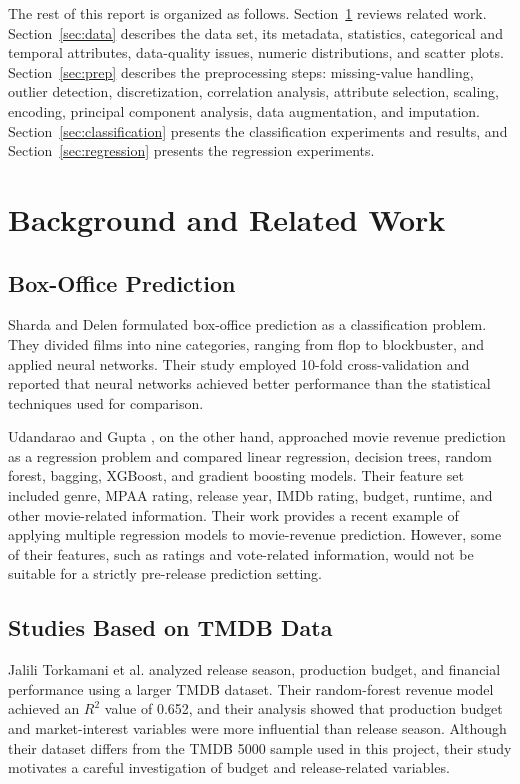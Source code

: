 \documentclass[conference]{IEEEtran}
\begin{document}
The rest of this report is organized as follows. Section~\ref{sec:related} reviews related work. Section~\ref{sec:data} describes the data set, its metadata, statistics, categorical and temporal attributes, data-quality issues, numeric distributions, and scatter plots. Section~\ref{sec:prep} describes the preprocessing steps: missing-value handling, outlier detection, discretization, correlation analysis, attribute selection, scaling, encoding, principal component analysis, data augmentation, and imputation. Section~\ref{sec:classification} presents the classification experiments and results, and Section~\ref{sec:regression} presents the regression experiments.

\section{Background and Related Work}\label{sec:related}

\subsection{Box-Office Prediction}

Sharda and Delen \cite{sharda2006} formulated box-office prediction as a classification problem. They divided films into nine categories, ranging from flop to blockbuster, and applied neural networks. Their study employed 10-fold cross-validation and reported that neural networks achieved better performance than the statistical techniques used for comparison.

Udandarao and Gupta \cite{udandarao2024}, on the other hand, approached movie revenue prediction as a regression problem and compared linear regression, decision trees, random forest, bagging, XGBoost, and gradient boosting models. Their feature set included genre, MPAA rating, release year, IMDb rating, budget, runtime, and other movie-related information. Their work provides a recent example of applying multiple regression models to movie-revenue prediction. However, some of their features, such as ratings and vote-related information, would not be suitable for a strictly pre-release prediction setting.

\subsection{Studies Based on TMDB Data}

Jalili Torkamani et al. \cite{torkamani2026} analyzed release season, production budget, and financial performance using a larger TMDB dataset. Their random-forest revenue model achieved an $R^2$ value of 0.652, and their analysis showed that production budget and market-interest variables were more influential than release season. Although their dataset differs from the TMDB 5000 sample used in this project, their study motivates a careful investigation of budget and release-related variables.
\end{document}
